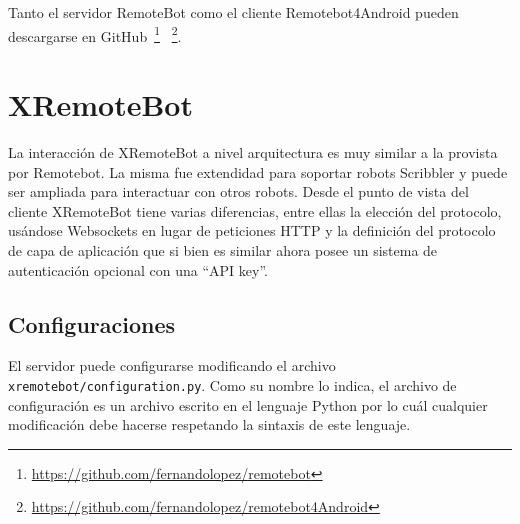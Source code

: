 Tanto el servidor RemoteBot como el cliente Remotebot4Android pueden
descargarse en
GitHub~\footnote{\url{https://github.com/fernandolopez/remotebot}}%
~\footnote{\url{https://github.com/fernandolopez/remotebot4Android}}.

\section{XRemoteBot}\label{sec:xremotebot}

La interacción de XRemoteBot a nivel arquitectura es muy similar a la
provista por Remotebot. La misma fue extendidad para
soportar robots Scribbler y puede ser
ampliada para interactuar con otros robots. Desde el punto de vista del cliente
XRemoteBot tiene varias diferencias, entre ellas la elección del protocolo,
usándose Websockets en lugar de peticiones HTTP y la definición del protocolo
de capa de aplicación que si bien es similar ahora posee un sistema de
autenticación opcional con una ``API key''.



\subsection{Configuraciones}

El servidor puede configurarse modificando el archivo
\texttt{xremotebot/configuration.py}. Como su nombre lo indica,
el archivo de configuración  es un archivo escrito en el lenguaje
Python por lo cuál cualquier modificación debe hacerse respetando
la sintaxis de este lenguaje.

